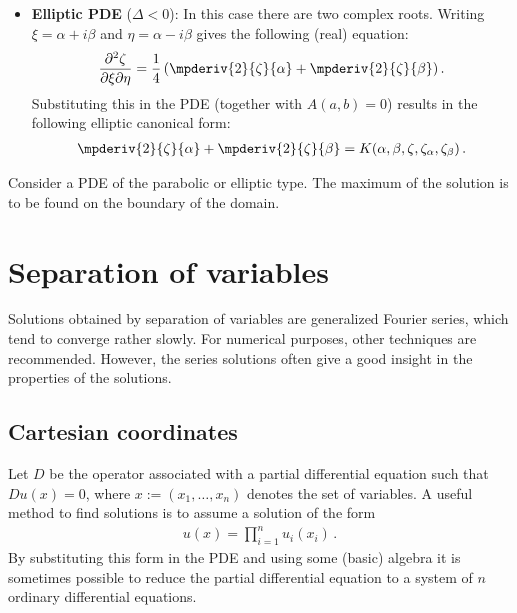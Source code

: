 {\begin{itemize}
                \begin{gather}
                    \label{pde:parabolic_canonical_form}
                    \mpderiv{2}{\zeta}{\eta} = G(\xi,\eta,\zeta,\zeta_\xi,\zeta_\eta)\,,
                \end{gather}
                where $G := \dfrac{F}{A(\eta_x,\eta_y)}$.
            \item\textbf{Elliptic PDE} ($\Delta<0$): In this case there are two complex roots. Writing $\xi = \alpha + i\beta$ and $\eta = \alpha - i\beta$ gives the following (real) equation: \[\frac{\partial^2\zeta}{\partial\xi\partial\eta} = \frac{1}{4}\left(\mpderiv{2}{\zeta}{\alpha} + \mpderiv{2}{\zeta}{\beta}\right).\] Substituting this in the PDE (together with $A(a,b)=0$) results in the following elliptic canonical form:
                \begin{gather}
                    \label{pde:elliptic_canonical_form}
                    \mpderiv{2}{\zeta}{\alpha} + \mpderiv{2}{\zeta}{\beta} = K(\alpha,\beta,\zeta,\zeta_\alpha,\zeta_\beta)\,.
                \end{gather}
        \end{itemize}
    }

    \begin{theorem}\label{pde:maximum_principle}
        Consider a PDE of the parabolic or elliptic type. The maximum of the solution is to be found on the boundary of the domain.
    \end{theorem}

\section{Separation of variables}\label{section:separation_of_variables}

    \begin{remark*}
        Solutions obtained by separation of variables are generalized Fourier series, which tend to converge rather slowly. For numerical purposes, other techniques are recommended. However, the series solutions often give a good insight in the properties of the solutions.
    \end{remark*}

\subsection{Cartesian coordinates}

    \begin{method}
        Let $D$ be the operator associated with a partial differential equation such that $Du(x)=0$, where $x:=(x_1,\ldots,x_n)$ denotes the set of variables. A useful method to find solutions is to assume a solution of the form
        \begin{gather}
            u(x) = \prod_{i=1}^nu_i(x_i)\,.
        \end{gather}
        By substituting this form in the PDE and using some (basic) algebra it is sometimes possible to reduce the partial differential equation to a system of $n$ ordinary differential equations.
    \end{method}

